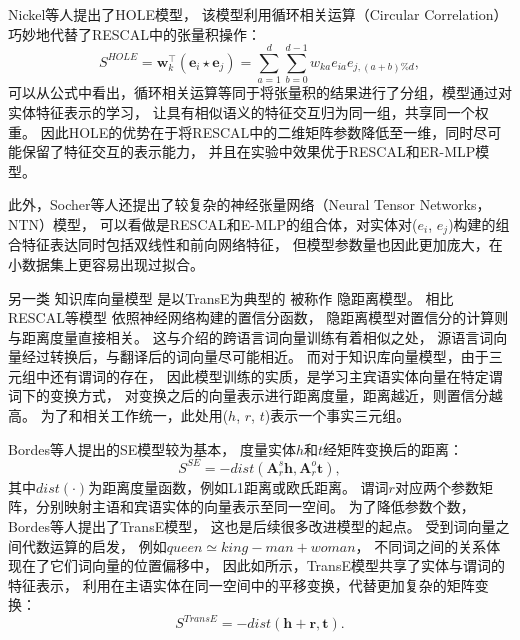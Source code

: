 Nickel等人提出了HOLE模型\cite{nickel2015holographic}，
该模型利用循环相关运算（Circular Correlation）巧妙地代替了RESCAL中的张量积操作：
\begin{equation}
S^{HOLE} = \bm{w}_k^\top (\bm{e}_i \star \bm{e}_j) = \sum_{a=1}^d \sum_{b=0}^{d-1} w_{ka} e_{ia} e_{j,(a+b) \% d},
\end{equation}
\noindent
可以从公式中看出，循环相关运算等同于将张量积的结果进行了分组，模型通过对实体特征表示的学习，
让具有相似语义的特征交互归为同一组，共享同一个权重。
因此HOLE的优势在于将RESCAL中的二维矩阵参数降低至一维，同时尽可能保留了特征交互的表示能力，
并且在实验中效果优于RESCAL和ER-MLP模型。

此外，Socher等人还提出了较复杂的神经张量网络（Neural Tensor Networks，NTN）模型\cite{socher2013reasoning}，
可以看做是RESCAL和E-MLP的组合体，对实体对($e_i$, $e_j$)构建的组合特征表达同时包括双线性和前向网络特征，
但模型参数量也因此更加庞大，在小数据集上更容易出现过拟合。



另一类 知识库向量模型   是以TransE为典型的 被称作 隐距离模型。
相比 RESCAL等模型 依照神经网络构建的置信分函数，
隐距离模型对置信分的计算则与距离度量直接相关。
这与介绍的跨语言词向量训练有着相似之处，
源语言词向量经过转换后，与翻译后的词向量尽可能相近。
而对于知识库向量模型，由于三元组中还有谓词的存在，
因此模型训练的实质，是学习主宾语实体向量在特定谓词下的变换方式，
对变换之后的向量表示进行距离度量，距离越近，则置信分越高。
为了和相关工作统一，此处用($h$, $r$, $t$)表示一个事实三元组。

Bordes等人提出的SE模型\cite{bordes2011learning}较为基本，
度量实体$h$和$t$经矩阵变换后的距离：
\begin{equation}
S^{SE} = -dist(\bm{A}_r^s \bm{h}, \bm{A}_r^o \bm{t}),
\end{equation}
\noindent
其中$dist(\cdot)$为距离度量函数，例如L1距离或欧氏距离。
谓词$r$对应两个参数矩阵，分别映射主语和宾语实体的向量表示至同一空间。
为了降低参数个数，Bordes等人提出了TransE模型\cite{bordes2013translating}，
这也是后续很多改进模型的起点。
受到词向量之间代数运算的启发，
例如$queen \simeq king - man + woman$\cite{mikolov2013linguistic}，
不同词之间的关系体现在了它们词向量的位置偏移中，
因此如所示，TransE模型共享了实体与谓词的特征表示，
利用在主语实体在同一空间中的平移变换，代替更加复杂的矩阵变换：
\begin{equation}
S^{TransE} = -dist(\bm{h} + \bm{r}, \bm{t} ).
\end{equation}

